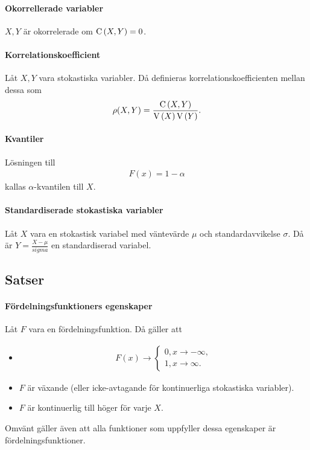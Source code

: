 \paragraph{Okorrellerade variabler}
$X, Y$ är okorrelerade om $\text{C}\left(X, Y\right) = 0$.

\paragraph{Korrelationskoefficient}
Låt $X, Y$ vara stokastiska variabler. Då definieras korrelationskoefficienten mellan dessa som
\begin{align*}
	\rho(X, Y) = \frac{\text{C}\left(X, Y\right)}{\text{V}\left(X\right)\text{V}\left(Y\right)}.
\end{align*}

\paragraph{Kvantiler}
Lösningen till
\begin{align*}
	F(x) = 1 - \alpha
\end{align*}
kallas $\alpha$-kvantilen till $X$.

\paragraph{Standardiserade stokastiska variabler}
Låt $X$ vara en stokastisk variabel med väntevärde $\mu$ och standardavvikelse $\sigma$. Då är $Y = \frac{X - \mu}{sigma}$ en standardiserad variabel.

\subsection{Satser}

\paragraph{Fördelningsfunktioners egenskaper}
Låt $F$ vara en fördelningsfunktion. Då gäller att
\begin{itemize}
	\item
	\begin{align*}
		F(x)\to
		\begin{cases}
			0, x\to -\infty, \\
			1, x\to\infty.
		\end{cases}
	\end{align*}
	\item $F$ är växande (eller icke-avtagande för kontinuerliga stokastiska variabler).
	\item $F$ är kontinuerlig till höger för varje $X$.
\end{itemize}
Omvänt gäller även att alla funktioner som uppfyller dessa egenskaper är fördelningsfunktioner.


